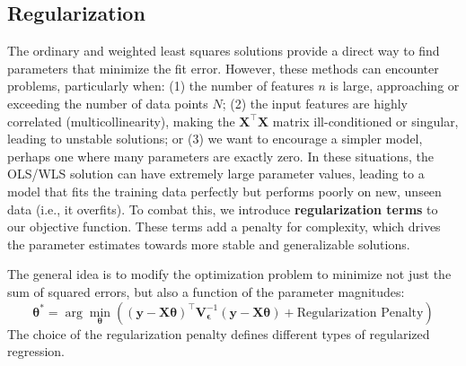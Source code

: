 \subsection{Regularization}
The ordinary and weighted least squares solutions provide a direct way to find parameters that minimize the fit error. However, these methods can encounter problems, particularly when: (1) the number of features $n$ is large, approaching or exceeding the number of data points $N$; (2) the input features are highly correlated (multicollinearity), making the $\mathbf{X}^\top\mathbf{X}$ matrix ill-conditioned or singular, leading to unstable solutions; or (3) we want to encourage a simpler model, perhaps one where many parameters are exactly zero. In these situations, the OLS/WLS solution can have extremely large parameter values, leading to a model that fits the training data perfectly but performs poorly on new, unseen data (i.e., it overfits). To combat this, we introduce \textbf{regularization terms} to our objective function. These terms add a penalty for complexity, which drives the parameter estimates towards more stable and generalizable solutions.

The general idea is to modify the optimization problem to minimize not just the sum of squared errors, but also a function of the parameter magnitudes:
\begin{equation}
    \boldsymbol{\theta}^* = \arg\min_{\boldsymbol{\theta}} \left( (\mathbf{y} - \mathbf{X}\boldsymbol{\theta})^\top \mathbf{V}_{\boldsymbol{\epsilon}}^{-1} (\mathbf{y} - \mathbf{X}\boldsymbol{\theta}) + \text{Regularization Penalty} \right)
    \label{eq:regularization-general}
\end{equation}
The choice of the regularization penalty defines different types of regularized regression.

